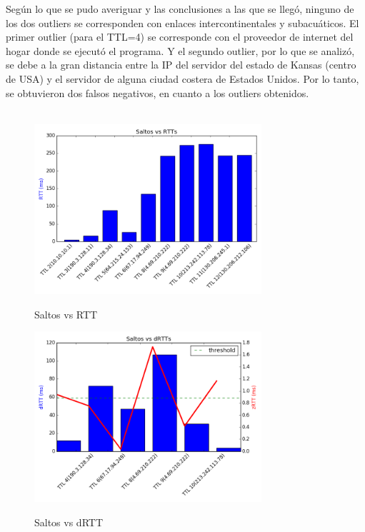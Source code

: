 Según lo que se pudo averiguar y las conclusiones a las que se llegó, ninguno de los dos outliers se corresponden con enlaces intercontinentales 
y subacuáticos. El primer outlier (para el TTL=4) se corresponde con el proveedor de internet del hogar donde se ejecutó el programa.
Y el segundo outlier, por lo que se analizó, se debe a la gran distancia entre la IP del servidor del estado de Kansas (centro de USA) 
y el servidor de alguna ciudad costera de Estados Unidos. Por lo tanto, se obtuvieron dos falsos negativos, en cuanto a los outliers obtenidos. \\ \\










\pagebreak


\begin{figure}[!h]
\centering
\caption{Saltos vs RTT}
\includegraphics[width=0.75\textwidth]{modules/EU-saltos-rtt}
\label{fig:EU-saltos-rtt}
\end{figure}


\begin{figure}[!h]
\centering
\caption{Saltos vs dRTT}
\includegraphics[width=0.75\textwidth]{modules/EU-saltos-drtt}
\label{fig:EU-saltos-drtt}
\end{figure}


